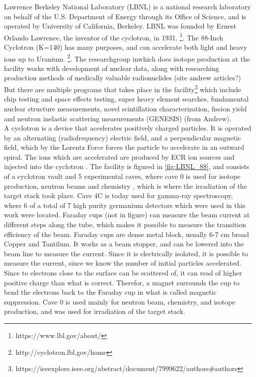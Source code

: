 Lawrence Berkeley National Laboratory (LBNL) is a national research laboratory on behalf of the U.S. Department of Energy through its Office of Science, and is operated by University of California, Berkeley. LBNL was founded by Ernest Orlando Lawrence, the inventor of the cyclotron, in 1931.  \footnote{https://www.lbl.gov/about/}. The 88-Inch Cyclotron (K=140) has many purposes, and can accelerate both light and heavy ions up to Uranium. \footnote{http://cyclotron.lbl.gov/home}. The researchgroup inwhich does isotope production at the facility works with development of nuclear data, along with researching production methods of medically valuable radionuclides (site andrew articles?)  %
But there are multiple programs that takes place in the facility\footnote{https://ieeexplore.ieee.org/abstract/document/7999622/authors#authors} which include chip testing and space effects testing, super heavy element searches, fundamental nuclear structure measurements, novel scintillation characterization, fission yield and neutron inelastic scattering measurements (GENESIS) (from Andrew). \\
\noindent 
A cyclotron is a device that accelerates positively charged particles. It is operated by an alternating (radiofrequency) electric field, and a perpendicular magnetic field, which by the Lorentz Force forces the particle to accelerate in an outward spiral. The ions which are accelerated are produced by ECR ion sources and injected into the cyclotron \cite{KireeffCovo2018a}. The facility is figured in \ref{fig:LBNL_88}, and consists of a cyclotron vault and 5 experimental caves, where cave 0 is used for isotope production, neutron beams and chemistry \cite{Andrew HFNG article?}, which is where the irradiation of the target stack took place. Cave 4C is today used for gamma-ray spectroscopy, where 6 of a total of 7 high purity germanium detectors which were used in this work were located. Faraday cups (not in figure) can measure the beam current at different steps along the tube, which makes it possible to measure the transition efficiency of the beam. Faraday cups are dense metal block, usually 6-7 cm broad Copper and Tantilum. It works as a beam stopper, and can be lowered into the beam line to measure the current. Since it is electrically isolated, it is possible to measure the current, since we know the number of initial particles accelerated. Since to electrons close to the surface can be scattered of, it can read of higher positive charge than what is correct. Therefor, a magnet surrounds the cup to bend the electrons back to the Faraday cup in what is called magnetic suppression. Cave 0 is used mainly for neutron beam, chemistry, and isotope production, and was used for irradiation of the target stack. 


